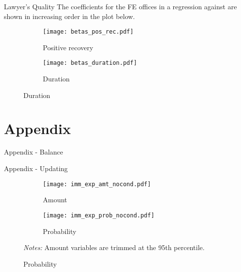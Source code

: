 \documentclass[8pt]{beamer}
\begin{document}
\begin{frame}{Lawyer's Quality}
    The coefficients for the FE offices in a regression against are shown in increasing order in the plot below.
    
    \begin{figure}[H]
    \begin{center}
        \begin{subfigure}{0.49\textwidth}
        \caption{Positive recovery}
            \centering
            \texttt{[image: betas\_pos\_rec.pdf]}
        \end{subfigure}
        \begin{subfigure}{0.49\textwidth}
        \caption{Duration}
                \centering
                \texttt{[image: betas\_duration.pdf]}
        \end{subfigure}
    \end{center} 
\end{figure} 
\end{frame}









\section{Appendix}

\begin{frame}{Appendix - Balance}
\begin{table}[H] 
 \begin{subtable}{1.\textwidth}
 \begin{center}
 \tiny{}
 \end{center}
 \end{subtable}
 \end{table}  
\end{frame}

\begin{frame}{Appendix - Updating}
    \begin{figure}[H]
    \caption{Immediate updating}
    \label{update_expimm}
    \begin{center}
        \begin{subfigure}{0.45\textwidth}
            \caption{Amount}
            \centering
            \texttt{[image: imm\_exp\_amt\_nocond.pdf]}
        \end{subfigure}
        \begin{subfigure}{0.45\textwidth}
            \caption{Probability}
                \centering
                \texttt{[image: imm\_exp\_prob\_nocond.pdf]}
        \end{subfigure}
    \end{center} 
         \scriptsize \textit{Notes:} Amount variables are trimmed at the 95th percentile.
\end{figure}
\end{frame}
\end{document}
